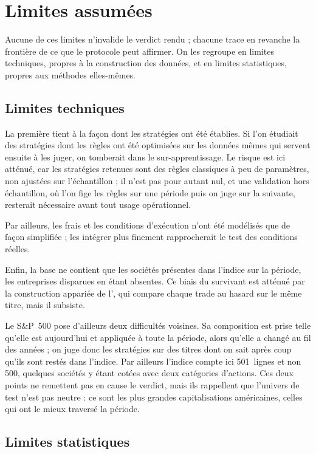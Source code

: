\section{Limites assumées}
\label{sec:limites}

Aucune de ces limites n'invalide le verdict rendu ; chacune trace en revanche
la frontière de ce que le protocole peut affirmer. On les regroupe en limites
techniques, propres à la construction des données, et en limites statistiques,
propres aux méthodes elles-mêmes.

\subsection*{Limites techniques}

La première tient à la façon dont les stratégies ont été établies. Si l'on
étudiait des stratégies dont les règles ont été optimisées sur les données
mêmes qui servent ensuite à les juger, on tomberait dans le sur-apprentissage.
Le risque est ici atténué, car les stratégies retenues sont des règles
classiques à peu de paramètres, non ajustées sur l'échantillon ; il n'est pas
pour autant nul, et une validation hors échantillon, où l'on fige les règles
sur une période puis on juge sur la suivante, resterait nécessaire avant tout
usage opérationnel.

Par ailleurs, les frais et les conditions d'exécution n'ont été modélisés que
de façon simplifiée ; les intégrer plus finement rapprocherait le test des
conditions réelles.

Enfin, la base ne contient que les sociétés présentes dans l'indice sur la
période, les entreprises disparues en étant absentes. Ce biais du survivant
est atténué par la construction appariée de l'\edgevar{}, qui compare chaque
trade au hasard sur le même titre, mais il subsiste.

Le S\&P~500 pose d'ailleurs deux difficultés voisines. Sa composition est
prise telle qu'elle est aujourd'hui et appliquée à toute la période, alors
qu'elle a changé au fil des années ; on juge donc les stratégies sur des
titres dont on sait après coup qu'ils sont restés dans l'indice. Par ailleurs
l'indice compte ici 501~lignes et non 500, quelques sociétés y étant cotées
avec deux catégories d'actions. Ces deux points ne remettent pas en cause le
verdict, mais ils rappellent que l'univers de test n'est pas neutre : ce sont
les plus grandes capitalisations américaines, celles qui ont le mieux
traversé la période.

\subsection*{Limites statistiques}

